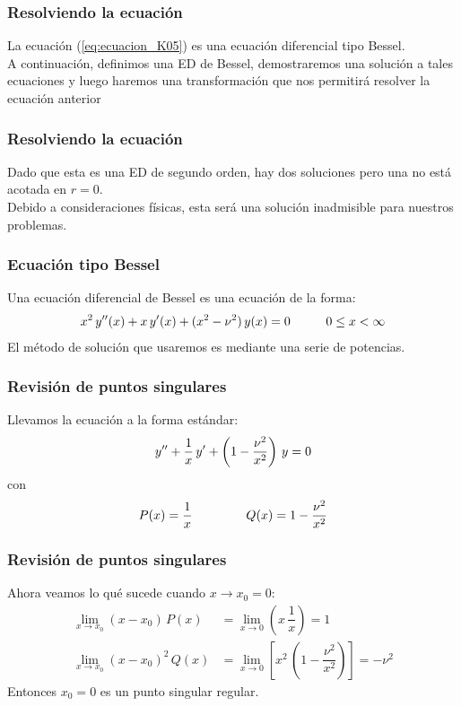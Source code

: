 \documentclass[12pt]{beamer}
\begin{document}
\begin{frame}
\frametitle{Resolviendo la ecuación}
La ecuación (\ref{eq:ecuacion_K05}) es una ecuación diferencial tipo Bessel.
\\
\bigskip
\pause
A continuación, definimos una ED de Bessel, demostraremos una solución a tales ecuaciones y luego haremos una transformación que nos permitirá resolver la ecuación anterior
\end{frame}
\begin{frame}
\frametitle{Resolviendo la ecuación}
Dado que esta es una ED de segundo orden, hay dos soluciones pero una no está acotada en $r=0$.
\\
\bigskip
\pause
Debido a consideraciones físicas, esta será una solución inadmisible para nuestros problemas.
\end{frame}
\begin{frame}
\frametitle{Ecuación tipo Bessel}
Una ecuación diferencial de Bessel es una ecuación de la forma:
\pause
\begin{align*}
x^{2} \, {y}^{\prime \prime} (x) + x \,{y}^{\prime} (x) + (x^{2} - \nu^{2}) \, y (x) = 0 \hspace{1cm} 0 \leq x < \infty
\end{align*}
\pause
El método de solución que usaremos es mediante una serie de potencias.
\end{frame}
\begin{frame}
\frametitle{Revisión de puntos singulares}
Llevamos la ecuación a la forma estándar:
\pause
\begin{align*}
    {y}^{\prime \prime} + \dfrac{1}{x} \, {y}^{\prime} + \left( 1 - \dfrac{\nu^{2}}{x^{2}} \right) \, y = 0
\end{align*}
con
\begin{align*}
    P (x) = \dfrac{1}{x} \hspace{1.5cm} Q(x) = 1 - \dfrac{\nu^{2}}{x^{2}}
\end{align*}
\end{frame}
\begin{frame}
\frametitle{Revisión de puntos singulares}
Ahora veamos lo qué sucede cuando $x \to x_{0} = 0$:
\pause
\begin{align*}
\lim_{x \to x_{0}} (x - x_{0}) \, P(x) &= \lim_{x \to 0} \left( x \, \dfrac{1}{x} \right) = 1 \\[1em]
\lim_{x \to x_{0}} (x - x_{0})^{2} \, Q(x) &= \lim_{x \to 0} \left[ x^{2} \, \left( 1 - \dfrac{\nu^{2}}{x^{2}} \right) \right] = - \nu^{2}
\end{align*}
\pause
Entonces $x_{0} = 0$ es un punto singular regular.
\end{frame}
\end{document}

